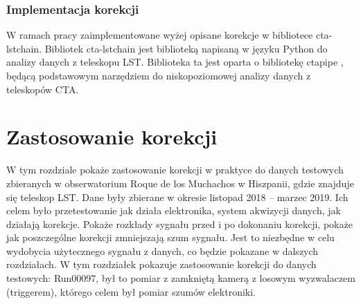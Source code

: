 \documentclass[a4paper,11pt,twoside]{article}
\begin{document}
\subsubsection{Implementacja korekcji}
W ramach pracy zaimplementowane wyżej opisane korekcje w bibliotece cta-lstchain. Bibliotek cta-lstchain \cite{lstchain_url} jest biblioteką napisaną w języku Python do analizy danych z teleskopu LST. Biblioteka ta jest oparta o bibliotekę ctapipe \cite{ctapipe_url}, będącą podstawowym narzędziem do niskopoziomowej analizy danych z teleskopów CTA.
\newpage
\section{Zastosowanie korekcji}
W tym rozdziale pokaże zastosowanie korekcji w praktyce do danych testowych zbieranych w obserwatorium Roque de los Muchachos w Hiszpanii, gdzie znajduje się teleskop LST. Dane były zbierane w okresie listopad 2018 -- marzec 2019. Ich celem było przetestowanie jak działa elektronika, system akwizycji danych, jak działają korekcje. Pokaże rozkłady sygnału przed i po dokonaniu korekcji, pokaże jak poszczególne korekcji zmniejszają szum sygnału. Jest to niezbędne w celu wydobycia użytecznego sygnału z danych, co będzie pokazane w dalszych rozdziałach. W tym rozdziałek pokazuje zastosowanie korekcji do danych testowych: Run00097, był to pomiar z zamkniętą kamerą z losowym wyzwalaczem (triggerem), którego celem był pomiar szumów elektroniki. 
\end{document}
